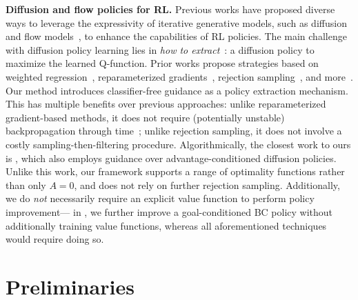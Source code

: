 \documentclass{article}
\begin{document}
\textbf{Diffusion and flow policies for RL.}
Previous works have proposed diverse ways
to leverage the expressivity of iterative generative models,
such as diffusion~\citep{diffusion_sohl2015, ddpm_ho2020}
and flow models~\citep{flow_lipman2023, flow_liu2023, flow_albergo2023},
to enhance the capabilities of RL policies.
The main challenge with diffusion policy learning lies in \emph{how to extract}~\citep{fql_park2025}:
a diffusion policy to maximize the learned Q-function.
Prior works propose strategies
based on weighted regression~\citep{qgpo_lu2023, edp_kang2023, qvpo_ding2024, qipo_zhang2025},
reparameterized gradients~\citep{dql_wang2023, diffcps_he2023, consistencyac_ding2024, srdp_ada2024, entropydql_zhang2024, fql_park2025},
rejection sampling~\citep{sfbc_chen2023, idql_hansenestruch2023, aligniql_he2024},
and more~\citep{dipo_yang2023, acd_kuba2023, diffusiondice_mao2024, eda_chen2024, srpo_chen2024, qsm_psenka2024, dtql_chen2024, ddiffpg_li2024, parl_mark2024, dac_fang2025, dppo_ren2025}.
Our method introduces classifier-free guidance as a policy extraction mechanism.
This has multiple benefits over previous approaches:
unlike reparameterized gradient-based methods, it does not require (potentially unstable) backpropagation through time~\citep{fql_park2025};
unlike rejection sampling, it does not involve a costly sampling-then-filtering procedure.
Algorithmically, the closest work to ours is \citet{acd_kuba2023}, which also employs guidance over advantage-conditioned diffusion policies. Unlike this work, our framework supports a range of optimality functions rather than only $A=0$, and does not rely on further rejection sampling. Additionally, we do \emph{not} necessarily require an explicit value function to perform policy improvement---%
in , we further improve a goal-conditioned BC policy without additionally training value functions,
whereas all aforementioned techniques would require doing so.




\section{Preliminaries}
\end{document}
